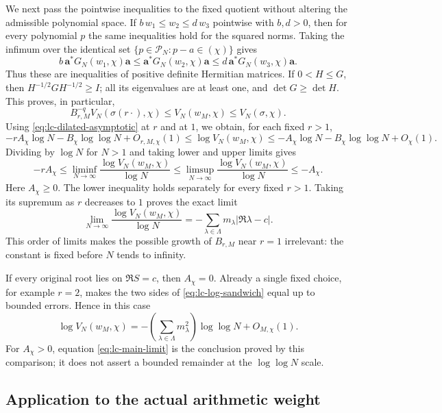 We next pass the pointwise inequalities to the fixed quotient without
altering the admissible polynomial space. If $b\,w_1\le w_2\le d\,w_3$
pointwise with $b,d>0$, then for every polynomial $p$ the same inequalities
hold for the squared norms. Taking the infimum over the identical set
$\{p\in\mathcal P_N:p-a\in(\chi)\}$ gives
\[
 b\,\boldsymbol a^*G_N(w_1,\chi)\boldsymbol a
 \le\boldsymbol a^*G_N(w_2,\chi)\boldsymbol a
 \le d\,\boldsymbol a^*G_N(w_3,\chi)\boldsymbol a.
\]
Thus these are inequalities of positive definite Hermitian matrices.
If $0<H\le G$, then $H^{-1/2}GH^{-1/2}\ge I$; all its eigenvalues are
at least one, and $\det G\ge\det H$. This proves, in particular,
\[
 B_{r,M}^{-q}V_N(\sigma(r\cdot),\chi)
 \le V_N(w_M,\chi)\le V_N(\sigma,\chi).
 \tag{LC.20}\label{eq:lc-volume-sandwich}
\]
Using \eqref{eq:lc-dilated-asymptotic} at $r$ and at $1$, we obtain, for
each fixed $r>1$,
\[
 -rA_\chi\log N-B_\chi\log\log N+O_{r,M,\chi}(1)
 \le\log V_N(w_M,\chi)
 \le-A_\chi\log N-B_\chi\log\log N+O_\chi(1).
 \tag{LC.21}\label{eq:lc-log-sandwich}
\]
Dividing by $\log N$ for $N>1$ and taking lower and upper limits gives
\[
 -rA_\chi
 \le\liminf_{N\to\infty}\frac{\log V_N(w_M,\chi)}{\log N}
 \le\limsup_{N\to\infty}\frac{\log V_N(w_M,\chi)}{\log N}
 \le-A_\chi.
\]
Here $A_\chi\ge0$. The lower inequality holds separately for every fixed
$r>1$. Taking its supremum as $r$ decreases to $1$ proves the exact limit
\[
 \boxed{\displaystyle
 \lim_{N\to\infty}\frac{\log V_N(w_M,\chi)}{\log N}
 =-\sum_{\lambda\in\Lambda}m_\lambda|\Re\lambda-c|.}
 \tag{LC.22}\label{eq:lc-main-limit}
\]
This order of limits makes the possible growth of $B_{r,M}$ near $r=1$
irrelevant: the constant is fixed before $N$ tends to infinity.

If every original root lies on $\Re S=c$, then $A_\chi=0$. Already a single
fixed choice, for example $r=2$, makes the two sides of
\eqref{eq:lc-log-sandwich} equal up to bounded errors. Hence in this case
\[
 \boxed{\displaystyle
 \log V_N(w_M,\chi)
 =-\left(\sum_{\lambda\in\Lambda}m_\lambda^2\right)
 \log\log N+O_{M,\chi}(1).}
 \tag{LC.23}\label{eq:lc-critical-law}
\]
For $A_\chi>0$, equation \eqref{eq:lc-main-limit} is the conclusion proved
by this comparison; it does not assert a bounded remainder at the
$\log\log N$ scale.

\subsection{Application to the actual arithmetic weight}

